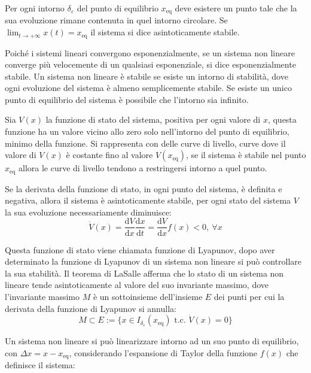 \documentclass{article}
\numberwithin{equation}{subsection}
\newcommand{\df}{\mathrm{d}}
\begin{document}
Per ogni intorno $\delta_{\varepsilon}$ del punto di equilibrio $x_{\mathrm{eq}}$ deve esistere un punto tale che la sua evoluzione rimane contenuta in quel intorno circolare. 
Se $\lim_{t\to+\infty}x(t)=x_\mathrm{eq}$ il sistema si dice asintoticamente stabile. 


Poiché i sistemi lineari convergono esponenzialmente, se un sistema non lineare converge più velocemente di un qualsiasi esponenziale, si dice esponenzialmente stabile. 
Un sistema non lineare è stabile se esiste un intorno di stabilità, dove ogni evoluzione del sistema è almeno semplicemente stabile. Se esiste un unico punto di equilibrio del 
sistema è possibile che l'intorno sia infinito. 


Sia $V(x)$ la funzione di stato del sistema, positiva per ogni valore di $x$, questa funzione ha un valore vicino allo zero solo 
nell'intorno del punto di equilibrio, minimo della funzione. Si rappresenta con delle curve di livello, curve dove il valore di $V(x)$ è costante fino al valore 
$V(x_\mathrm{eq})$, se il sistema è stabile nel punto $x_\mathrm{eq}$ allora le curve di livello tendono a restringersi intorno a quel punto. 


Se la derivata della funzione di stato, in ogni punto del sistema, è definita e negativa, allora il sistema è asintoticamente stabile, per ogni stato del sistema $V$ la sua 
evoluzione necessariamente diminuisce:
\begin{equation*}
    \dot V(x)=\displaystyle\frac{\df V}{\df x}\frac{\df x}{\df t}=\frac{\df V}{\df x}f(x)<0,\:\forall x
\end{equation*}

Questa funzione di stato viene chiamata funzione di Lyapunov, dopo aver determinato la funzione di Lyapunov di un sistema non lineare si può controllare la sua stabilità. 
Il teorema di LaSalle afferma che lo stato di un sistema non lineare tende asintoticamente al valore del suo invariante massimo, dove l'invariante massimo $M$ è un sottoinsieme 
dell'insieme $E$ dei punti per cui la derivata della funzione di Lyapunov si annulla: 
\begin{equation*}
    M\subset E:=\{x\in I_{\delta_{\varepsilon}}(x_\mathrm{eq})\mbox{ t.c. }\dot V(x)=0\}
\end{equation*}


Un sistema non lineare si può linearizzare intorno ad un suo punto di equilibrio, con $\Delta x=x-x_\mathrm{eq}$, considerando l'espansione di Taylor della funzione $f(x)$ che 
definisce il sistema:
\end{document}
